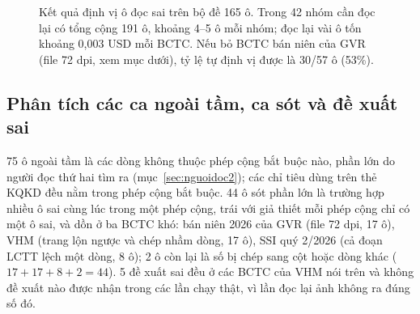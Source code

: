 \documentclass[12pt,a4paper]{report}
\begin{document}
\begin{figure}[H]
\centering
{}
\caption{Kết quả định vị ô đọc sai trên bộ đề 165 ô. Trong 42 nhóm cần đọc lại có tổng cộng 191 ô, khoảng 4--5 ô mỗi
nhóm; đọc lại vài ô tốn khoảng 0,003 USD mỗi BCTC. Nếu bỏ BCTC bán niên của GVR (file 72 dpi, xem mục dưới), tỷ lệ tự
định vị được là 30/57 ô (53\%).}\label{fig:evalrepair}
\end{figure}

\subsection{Phân tích các ca ngoài tầm, ca sót và đề xuất sai}
75 ô ngoài tầm là các dòng không thuộc phép cộng bắt buộc nào, phần lớn do người đọc thứ hai tìm ra
(mục~\ref{sec:nguoidoc2}); các chỉ tiêu dùng trên thẻ KQKD đều nằm trong phép cộng bắt buộc. 44 ô sót phần lớn là
trường hợp nhiều ô sai cùng lúc trong một phép cộng, trái với giả thiết mỗi phép cộng chỉ có một ô sai, và dồn ở ba
BCTC khó: bán niên 2026 của GVR (file 72 dpi, 17 ô), VHM (trang lộn ngược và chép nhầm dòng, 17 ô), SSI quý 2/2026 (cả
đoạn LCTT lệch một dòng, 8 ô); 2 ô còn lại là số bị chép sang cột hoặc dòng khác ($17 + 17 + 8 + 2 = 44$). 5 đề xuất sai
đều ở các BCTC của VHM nói trên và không đề xuất nào được nhận trong các lần chạy thật, vì lần đọc lại ảnh không ra
đúng số đó.
\end{document}
